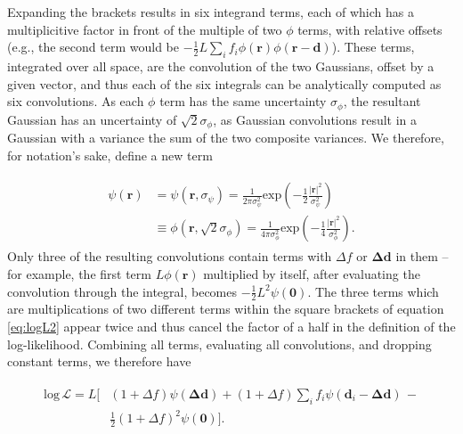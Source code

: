 \documentclass[fleqn,usenatbib]{mnras}
\begin{document}
Expanding the brackets results in six integrand terms, each of which has a multiplicitive factor in front of the multiple of two $\phi$ terms, with relative offsets (e.g., the second term would be $-\frac{1}{2}L\sum_i f_i\phi(\mathbf{r})\phi(\mathbf{r - d})$). These terms, integrated over all space, are the convolution of the two Gaussians, offset by a given vector, and thus each of the six integrals can be analytically computed as six convolutions. As each $\phi$ term has the same uncertainty $\sigma_\phi$, the resultant Gaussian has an uncertainty of $\sqrt{2}\sigma_\phi$, as Gaussian convolutions result in a Gaussian with a variance the sum of the two composite variances. We therefore, for notation's sake, define a new term

\begin{align}
\begin{split}
    \psi(\mathbf{r}) &= \psi(\mathbf{r}, \sigma_\psi) = \frac{1}{2\pi \sigma_\psi^2}\mathrm{exp}\left(-\frac{1}{2} \frac{\lvert\mathbf{r}\lvert^2}{\sigma_\psi^2}\right) \\&\equiv \phi(\mathbf{r}, \sqrt{2}\sigma_\phi) = \frac{1}{4\pi \sigma_\phi^2}\mathrm{exp}\left(-\frac{1}{4} \frac{\lvert\mathbf{r}\lvert^2}{\sigma_\phi^2}\right).
\end{split}
\end{align}
Only three of the resulting convolutions contain terms with $\Delta f$ or $\mathbf{\Delta d}$ in them -- for example, the first term $L\phi(\mathbf{r})$ multiplied by itself, after evaluating the convolution through the integral, becomes $-\frac{1}{2} L^2 \psi(\mathbf{0})$. The three terms which are multiplications of two different terms within the square brackets of equation \ref{eq:logL2} appear twice and thus cancel the factor of a half in the definition of the log-likelihood. Combining all terms, evaluating all convolutions, and dropping constant terms, we therefore have

\begin{align}
\begin{split}
    \mathrm{log}\,\mathcal{L} = L \bigg[&(1 + \Delta f)\psi(\mathbf{\Delta d}) + (1 + \Delta f)\sum\limits_if_i\psi(\mathbf{d}_i - \mathbf{\Delta d})\,-\\&\frac{1}{2}(1 + \Delta f)^2\psi(\mathbf{0})\Bigg].
\end{split}
\end{align}
\end{document}
